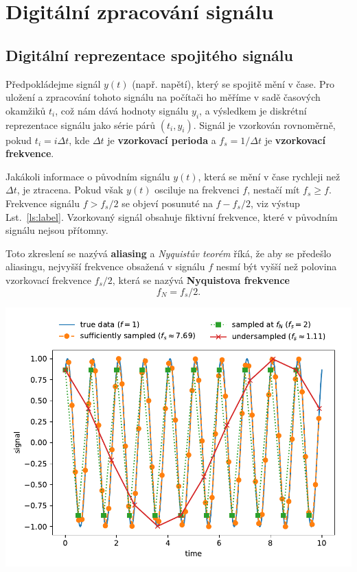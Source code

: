 \newpage
\section{Digitální zpracování signálu}
\subsection{Digitální reprezentace spojitého signálu}
Předpokládejme signál $y(t)$ (např. napětí), který se spojitě mění v čase. Pro uložení a zpracování tohoto signálu na počítači ho měříme v sadě časových okamžiků $t_i$, což nám dává hodnoty signálu $y_i$, a výsledkem je diskrétní reprezentace signálu jako série párů $(t_i, y_i)$. Signál je vzorkován rovnoměrně, pokud $t_i = i\Delta t$, kde $\Delta t$ je \textbf{vzorkovací perioda} a $f_s = 1/\Delta t$ je \textbf{vzorkovací frekvence}.

Jakákoli informace o původním signálu $y(t)$, která se mění v čase rychleji než $\Delta t$, je ztracena. Pokud však $y(t)$ osciluje na frekvenci $f$, nestačí mít $f_s \geq f$. Frekvence signálu $f > f_s/2$ se objeví posunuté na $f - f_s/2$, viz výstup Lst.~\ref{ls:label}. Vzorkovaný signál obsahuje fiktivní frekvence, které v původním signálu nejsou přítomny.

Toto zkreslení se nazývá \textbf{aliasing} a \emph{Nyquistův teorém} říká, že aby se předešlo aliasingu, nejvyšší frekvence obsažená v signálu $f$ nesmí být vyšší než polovina vzorkovací frekvence $f_s/2$, která se nazývá \textbf{Nyquistova frekvence}
\begin{equation}
    \label{eq:nqyust}
    f_N = f_s/2.
\end{equation}


\begin{center}
    \includegraphics[width=0.75\linewidth]{sampling.pdf}
\end{center}

